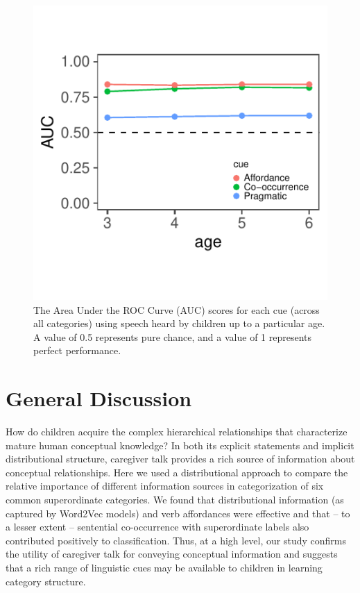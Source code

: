 \documentclass[english,,man,floatsintext]{apa6}
\begin{document}
\begin{figure}[h]

{\centering \includegraphics{cogsci_journal_files/figure-latex/dev-1} 

}

\caption{\label{fig:dev} The Area Under the ROC Curve (AUC) scores for each cue (across all categories) using speech heard by children up to a particular age. A value of 0.5 represents pure chance, and a value of 1 represents perfect performance.}\label{fig:dev}
\end{figure}

\hypertarget{general-discussion}{%
\section{General Discussion}\label{general-discussion}}

How do children acquire the complex hierarchical relationships that characterize mature human conceptual knowledge? In both its explicit statements and implicit distributional structure, caregiver talk provides a rich source of information about conceptual relationships. Here we used a distributional approach to compare the relative importance of different information sources in categorization of six common superordinate categories. We found that distributional information (as captured by Word2Vec models) and verb affordances were effective and that -- to a lesser extent -- sentential co-occurrence with superordinate labels also contributed positively to classification. Thus, at a high level, our study confirms the utility of caregiver talk for conveying conceptual information and suggests that a rich range of linguistic cues may be available to children in learning category structure.
\end{document}
